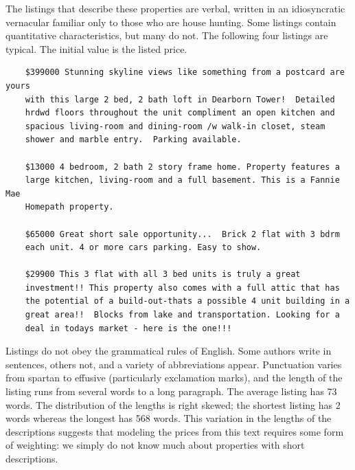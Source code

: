\documentclass[12pt]{article}
\begin{document}
 The listings that describe these properties are verbal, written in an
 idiosyncratic vernacular familiar only to those who are house hunting.  Some
 listings contain quantitative characteristics, but many do not.  The 
 following four listings are typical.  The initial value is the listed price.

 \begin{verbatim}
    $399000 Stunning skyline views like something from a postcard are yours
    with this large 2 bed, 2 bath loft in Dearborn Tower!  Detailed
    hrdwd floors throughout the unit compliment an open kitchen and
    spacious living-room and dining-room /w walk-in closet, steam
    shower and marble entry.  Parking available. 

    $13000 4 bedroom, 2 bath 2 story frame home. Property features a
    large kitchen, living-room and a full basement. This is a Fannie Mae
    Homepath property. 

    $65000 Great short sale opportunity...  Brick 2 flat with 3 bdrm
    each unit. 4 or more cars parking. Easy to show. 

    $29900 This 3 flat with all 3 bed units is truly a great
    investment!! This property also comes with a full attic that has
    the potential of a build-out-thats a possible 4 unit building in a 
    great area!!  Blocks from lake and transportation. Looking for a
    deal in todays market - here is the one!!! 
 \end{verbatim}

 \noindent
 Listings do not obey the grammatical rules of English.  Some authors write in
 sentences, others not, and a variety of abbreviations appear.  Punctuation varies from spartan to effusive (particularly exclamation marks),
 and the length of the listing runs from several words to a long paragraph.  The
 average listing has 73 words. The distribution of the lengths is right
 skewed; the shortest listing has 2 words whereas the longest has 568 words.
  This variation in the lengths of the descriptions suggests that modeling the
 prices from this text requires some form of weighting: we simply do not
 know much about properties with short descriptions.
\end{document}
